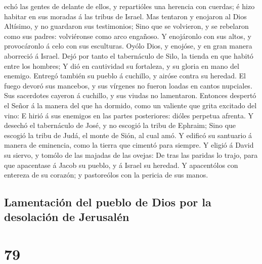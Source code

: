 echó las gentes de delante de ellos, y repartióles una herencia con
cuerdas; é hizo habitar en sus moradas á las tribus de Israel.
 Mas tentaron y enojaron al Dios Altísimo, y no guardaron
sus testimonios;  Sino que se volvieron, y se rebelaron
como sus padres: volviéronse como arco engañoso.  Y
enojáronlo con sus altos, y provocáronlo á celo con sus esculturas.
 Oyólo Dios, y enojóse, y en gran manera aborreció á
Israel.  Dejó por tanto el tabernáculo de Silo, la tienda
en que habitó entre los hombres;  Y dió en cautividad su
fortaleza, y su gloria en mano del enemigo.  Entregó
también su pueblo á cuchillo, y airóse contra su heredad.
 El fuego devoró sus mancebos, y sus vírgenes no fueron
loadas en cantos nupciales.  Sus sacerdotes cayeron á
cuchillo, y sus viudas no lamentaron.  Entonces despertó
el Señor á la manera del que ha dormido, como un valiente que grita
excitado del vino:  E hirió á sus enemigos en las partes
posteriores: dióles perpetua afrenta.  Y desechó el
tabernáculo de José, y no escogió la tribu de Ephraim; 
Sino que escogió la tribu de Judá, el monte de Sión, al cual amó.
 Y edificó su santuario á manera de eminencia, como la
tierra que cimentó para siempre.  Y eligió á David su
siervo, y tomólo de las majadas de las ovejas:  De tras
las paridas lo trajo, para que apacentase á Jacob su pueblo, y á Israel
su heredad.  Y apacentólos con entereza de su corazón; y
pastoreólos con la pericia de sus manos.

\hypertarget{lamentaciuxf3n-del-pueblo-de-dios-por-la-desolaciuxf3n-de-jerusaluxe9n}{%
\subsection{Lamentación del pueblo de Dios por la desolación de
Jerusalén}\label{lamentaciuxf3n-del-pueblo-de-dios-por-la-desolaciuxf3n-de-jerusaluxe9n}}

\hypertarget{section-78}{%
\section{79}\label{section-78}}

